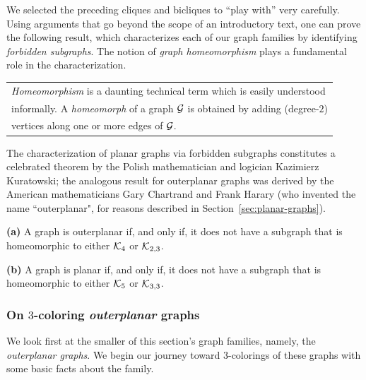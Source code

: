 We selected the preceding cliques and bicliques to ``play with'' very carefully.  Using arguments that go beyond the scope of an introductory text, one can prove the following result, which characterizes each of our graph families by identifying {\it forbidden subgraphs}.   The notion of {\it graph homeomorphism} plays a fundamental role in the characterization.

\smallskip

\begin{tabular}{l}
{\it Homeomorphism} is a daunting technical term which is easily understood \\
informally.  A {\it homeomorph} of a graph $\mbox{$\cal G$}$ is obtained by adding (degree-$2$) \\
vertices along one or more edges of $\mbox{$\cal G$}$.
\end{tabular}

\smallskip


\noindent
The characterization of planar graphs via forbidden subgraphs constitutes a celebrated theorem by the Polish mathematician and logician Kazimierz Kuratowski; the analogous result for outerplanar graphs was derived by the American mathematicians Gary Chartrand and Frank Harary (who invented the name ``outerplanar", for reasons described in Section~\ref{sec:planar-graphs}).

 
 
\begin{theorem}
\label{thm:planar+outerplanar-exclusion}
{\bf (a)} {\rm \cite{ChartrandB67}}
A graph is outerplanar if, and only if, it does not have a subgraph that is homeomorphic to either $\mbox{$\cal K$}_4$ or $\mbox{$\cal K$}_{2,3}$.

\smallskip

\noindent
{\bf (b)} {\rm \cite{Kuratowski30}}
A graph is planar if, and only if, it does not have a subgraph that is homeomorphic to either $\mbox{$\cal K$}_5$ or $\mbox{$\cal K$}_{3,3}$.
\end{theorem}


\subsubsection{On $3$-coloring {\em outerplanar} graphs}


We look first at the smaller of this section's graph families, namely, the {\it outerplanar graphs}. 
We begin our journey toward $3$-colorings of these graphs with some basic facts about the family.

